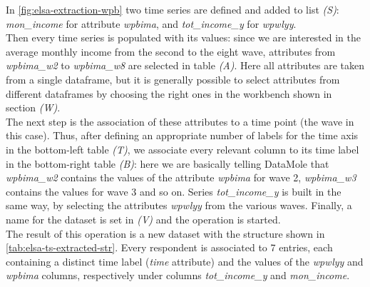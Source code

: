 In \cref{fig:elsa-extraction-wpb} two time series are defined and added to list \textit{(S)}: \textit{mon\_income} for attribute \textit{wpbima}, and  \textit{tot\_income\_y} for \textit{wpwlyy}.\\
Then every time series is populated with its values: since we are interested in the average monthly income from the second to the eight wave, attributes from \textit{wpbima\_w2} to \textit{wpbima\_w8} are selected in table \textit{(A)}. Here all attributes are taken from a single dataframe, but it is generally possible to select attributes from different dataframes by choosing the right ones in the workbench shown in section \textit{(W)}.\\
The next step is the association of these attributes to a time point (the wave in this case). Thus, after defining an appropriate number of labels for the time axis in the bottom-left table \textit{(T)}, we associate every relevant column to its time label in the bottom-right table \textit{(B)}: here we are basically telling DataMole that \textit{wpbima\_w2} contains the values of the attribute \textit{wpbima} for wave 2, \textit{wpbima\_w3} contains the values for wave 3 and so on. Series \textit{tot\_income\_y} is built in the same way, by selecting the attributes \textit{wpwlyy} from the various waves. Finally, a name for the dataset is set in \textit{(V)} and the operation is started.\\
The result of this operation is a new dataset with the structure shown in \cref{tab:elsa-ts-extracted-str}. Every respondent is associated to 7 entries, each containing a distinct time label (\textit{time} attribute) and the values of the \textit{wpwlyy} and \textit{wpbima} columns, respectively under columns \textit{tot\_income\_y} and \textit{mon\_income}.\\ \noindent

